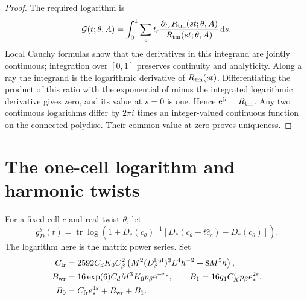 \documentclass[11pt,letterpaper,reqno]{amsart}
\newcommand{\dd}{\mathrm d}
\DeclareMathOperator{\tr}{tr}
\begin{document}
\begin{proof}
The required logarithm is
\begin{equation}\label{eq:interacting-logarithm}
 \mathcal G(t;\theta,A)=
 \int_0^1\sum_ct_c
       \frac{\partial_{t_c}R_{\rm tm}(st;\theta,A)}
            {R_{\rm tm}(st;\theta,A)}\,\dd s .
\end{equation}
Local Cauchy formulas show that the derivatives
in this integrand are jointly continuous;
integration over $[0,1]$ preserves continuity
and analyticity. Along a ray the integrand is
the logarithmic derivative of $R_{\rm tm}(st)$.
Differentiating the product of this ratio with
the exponential of minus the integrated
logarithmic derivative gives zero, and its
value at $s=0$ is one. Hence
$\mathrm e^{\mathcal G}=R_{\rm tm}$.
Any two continuous logarithms differ by
$2\pi i$ times an integer-valued continuous
function on the connected polydisc. Their
common value at zero proves uniqueness.
\end{proof}

\section{The one-cell logarithm and harmonic twists}
\label{subsec:interacting-one-cell}

For a fixed cell $c$ and real twist $\theta$, let
\begin{equation}\label{eq:interacting-free-coarse-log}
 g_D^\theta(t)=\tr\log\left(1+D_*(c_\theta)^{-1}
                   [D_*(c_\theta+t\widehat c_c)-D_*(c_\theta)]\right).
\end{equation}
The logarithm here is the matrix power series.
Set
\begin{align}
 C_{\rm fr}&=2592C_dK_0C_\beta^2
       \left(M^2(D_\beta^{\rm buf})^3L^4h^{-2}+8M^5h\right),
                                                   \notag\\
 B_{\rm wr}&=16\exp(6)C_dM^3K_0p_\beta \mathrm e^{-r_*},
 \qquad B_1=16g_1C_K'p_\beta e_*^{2\varepsilon},       \notag\\
 B_0&=C_{\rm fr}e_*^{4\varepsilon}+B_{\rm wr}+B_1 .
                                \label{eq:interacting-free-log-constants}
\end{align}
\end{document}
